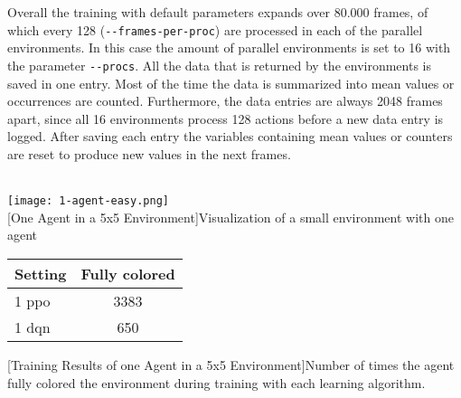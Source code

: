 Overall the training with default parameters expands over 80.000 frames, of which every 128 (\verb|--frames-per-proc|) are processed in each of the parallel environments. In this case the amount of parallel environments is set to 16 with the parameter \verb|--procs|. All the data that is returned by the environments is saved in one entry. Most of the time the data is summarized into mean values or occurrences are counted. Furthermore, the data entries are always 2048 frames apart, since all 16 environments process 128 actions before a new data entry is logged. After saving each entry the variables containing mean values or counters are reset to produce new values in the next frames. \\\\


\begin{minipage}{\textwidth}
  \begin{minipage}[b]{0.29\textwidth}
    \centering
    \texttt{[image: 1-agent-easy.png]}\\
    [One Agent in a 5x5 Environment]{Visualization of a small environment with one agent}\label{fig:1-easy}
  \end{minipage}
  \hfill
  \begin{minipage}[b]{0.69\textwidth}
    \centering
    \begin{tabular}{lc}\hline
      Setting & Fully colored \\ \hline
        1 ppo & 3383 \\
        1 dqn & 650 \\ \hline
      \end{tabular}
      [Training Results of one Agent in a 5x5 Environment]{Number of times the agent fully colored the environment during training with each learning algorithm. \\}\label{t:1-easy}
    \end{minipage}
  \end{minipage}\\\\


